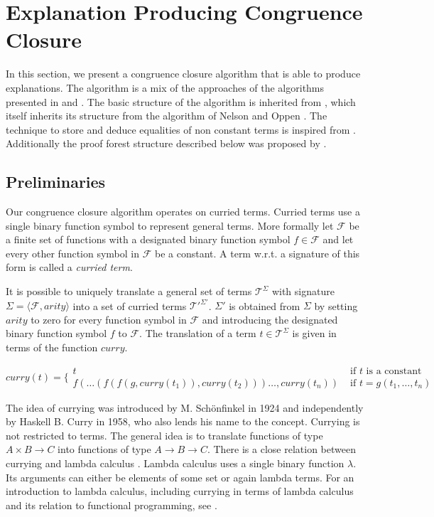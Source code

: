 \section*{Explanation Producing Congruence Closure}
\label{sec:algorithm}

In this section, we present a congruence closure algorithm that is able to produce explanations.
The algorithm is a mix of the approaches of the algorithms presented in \cite{Fontaine2004} and \cite{Nieuwenhuis2005,Nieuwenhuis2007}.
The basic structure of the algorithm is inherited from \cite{Fontaine2004}, which itself inherits its structure from the algorithm of Nelson and Oppen \cite{Nelson1980}.
The technique to store and deduce equalities of non constant terms is inspired from \cite{Nieuwenhuis2005,Nieuwenhuis2007}.
Additionally the proof forest structure described below was proposed by \cite{Nieuwenhuis2005,Nieuwenhuis2007}.

\subsection*{Preliminaries}
\label{subsec:algorithms_preliminaries}

Our congruence closure algorithm operates on curried terms.
Curried terms use a single binary function symbol to represent general terms.
More formally let $\mathcal{F}$ be a finite set of functions with a designated binary function symbol $f \in \mathcal{F}$ and let every other function symbol in $\mathcal{F}$ be a constant.
A term w.r.t. a signature of this form is called a \emph{curried term}.

It is possible to uniquely translate a general set of terms $\mathcal{T}^{\Sigma}$ with signature $\Sigma = \langle \mathcal{F},arity \rangle$ into a set of curried terms $\mathcal{T'}^{\Sigma'}$.
$\Sigma'$ is obtained from $\Sigma$ by setting $arity$ to zero for every function symbol in $\mathcal{F}$ and introducing the designated binary function symbol $f$ to $\mathcal{F}$.
The translation of a term $t \in \mathcal{T}^{\Sigma}$ is given in terms of the function $curry$.

$$
curry(t) = \Big\{
\begin{array}{ll}
	t & \text{ if } t \text{ is a constant }\\
	f(\ldots (f(f(g,curry(t_1)),curry(t_2)))\ldots,curry(t_n)) &\text{ if } t = g(t_1,\ldots, t_n)
\end{array}
$$

The idea of currying was introduced by M. Sch\"onfinkel \cite{Schoenfinkel1924} in 1924 and independently by Haskell B. Curry \cite{Curry1958} in 1958, who also lends his name to the concept.
Currying is not restricted to terms.
The general idea is to translate functions of type $A \times B \rightarrow C$ into functions of type $A \rightarrow B \rightarrow C$.
There is a close relation between currying and lambda calculus \cite{Church1936}.
Lambda calculus uses a single binary function $\lambda$.
Its arguments can either be elements of some set or again lambda terms.
For an introduction to lambda calculus, including currying in terms of lambda calculus and its relation to functional programming, see \cite{Barendregt1997}.

